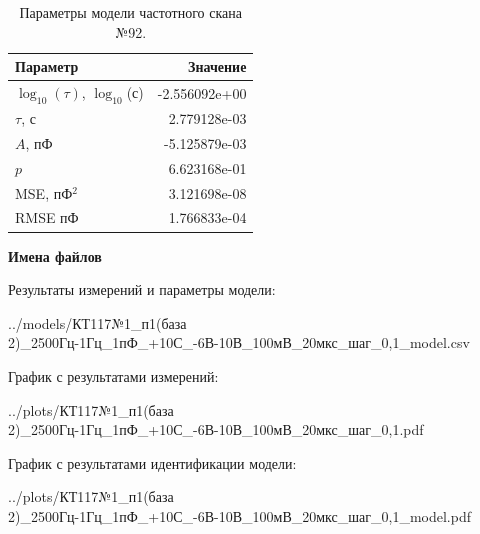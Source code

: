 \begin{table}[!ht]
    \centering
    \caption{Параметры модели частотного скана №92.}
    \begin{tabular}{|l|r|}
        \hline
        Параметр                                       & Значение                  \\ \hline
        $\log_{10}(\tau)$, $\log_{10}$(с)              & -2.556092e+00             \\ \hline
        $\tau$, с                                      & 2.779128e-03              \\ \hline
        $A$, пФ                                        & -5.125879e-03             \\ \hline
        $p$                                            & 6.623168e-01              \\ \hline
        MSE, пФ$^2$                                    & 3.121698e-08              \\ \hline
        RMSE пФ                                        & 1.766833e-04              \\ \hline
    \end{tabular}
    \label{table:frequency_scan_model_92}
\end{table}

\textbf{Имена файлов}

Результаты измерений и параметры модели:

\scriptsize../models/КТ117№1\_п1(база 2)\_2500Гц-1Гц\_1пФ\_+10С\_-6В-10В\_100мВ\_20мкс\_шаг\_0,1\_model.csv
\normalsize

График с результатами измерений:

\scriptsize../plots/КТ117№1\_п1(база 2)\_2500Гц-1Гц\_1пФ\_+10С\_-6В-10В\_100мВ\_20мкс\_шаг\_0,1.pdf
\normalsize

График с результатами идентификации модели:

\scriptsize../plots/КТ117№1\_п1(база 2)\_2500Гц-1Гц\_1пФ\_+10С\_-6В-10В\_100мВ\_20мкс\_шаг\_0,1\_model.pdf
\normalsize


